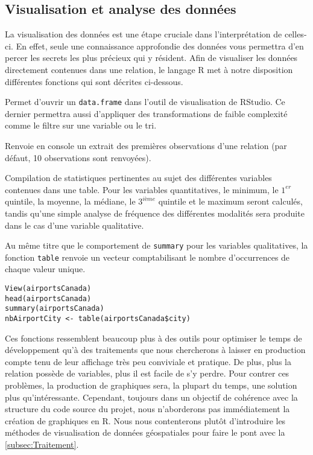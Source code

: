 \subsection{Visualisation et analyse des données}
\label{subsec:Visualisation}

La visualisation des données est une étape cruciale dans l’interprétation de celles-ci. En effet, seule une connaissance approfondie des données vous permettra d'en percer les secrets les plus précieux qui y résident. Afin de visualiser les données directement contenues dans une relation, le langage R met à notre disposition différentes fonctions qui sont décrites ci-dessous. 

\begin{description}[style=multiline,leftmargin=2cm]
		\item[\texttt{View}] Permet d'ouvrir un \texttt{data.frame} dans l'outil de visualisation de RStudio. Ce dernier permettra aussi d'appliquer des transformations de faible complexité comme le filtre sur une variable ou le tri. \cite{Rfunction:View}
		\item[\texttt{head}] Renvoie en console un extrait des premières observations d'une relation (par défaut, 10 observations sont renvoyées). \cite{Rfunction:head}
		\item[\texttt{summary}] Compilation de statistiques pertinentes au sujet des différentes variables contenues dans une table. Pour les variables quantitatives, le minimum, le $1^{er}$ quintile, la moyenne, la médiane, le $3^{ième}$ quintile et le maximum seront calculés, tandis qu'une simple analyse de fréquence des différentes modalités sera produite dans le cas d'une variable qualitative.
		\item[\texttt{table}] Au même titre que le comportement de \texttt{summary} pour les variables qualitatives, la fonction \texttt{table} renvoie un vecteur comptabilisant le nombre d'occurrences de chaque valeur unique. \cite{Rfunction:table}
\end{description}

\begin{lstlisting}[caption = Fonctions de visualisation de données,label=src:DataVisual]
View(airportsCanada)
head(airportsCanada)
summary(airportsCanada)
nbAirportCity <- table(airportsCanada$city) 
\end{lstlisting}

\vspace{\baselineskip}
Ces fonctions ressemblent beaucoup plus à des outils pour optimiser le temps de développement qu'à des traitements que nous chercherons à laisser en production compte tenu de leur affichage très peu conviviale et pratique. De plus, plus la relation possède de variables, plus il est facile de s'y perdre. Pour contrer ces problèmes, la production de graphiques sera, la plupart du temps, une solution plus qu'intéressante. Cependant, toujours dans un objectif de cohérence avec la structure du code source du projet, nous n'aborderons pas immédiatement la création de graphiques en R. Nous nous contenterons plutôt d'introduire les méthodes de visualisation de données géospatiales pour faire le pont avec la \autoref{subsec:Traitement}.\\

